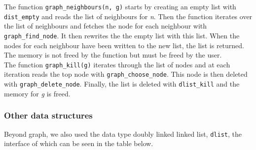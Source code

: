 \documentclass{article}
\begin{document}
\noindent
The function \texttt{graph\_neighbours(n, g)} starts by creating an empty list with \texttt{dist\_empty} and reads the list of neighbours for \textit{n}. Then the function iterates over the list of neighbours and fetches the node for each neighbour with \texttt{graph\_find\_node}. It then rewrites the the empty list with this list. When the nodes for each neighbour have been written to the new list, the list is returned. The memory is not freed by the function but must be freed by the user. \\

\noindent
The function \texttt{graph\_kill(g)} iterates through the list of nodes and at each iteration reads the top node with \texttt{graph\_choose\_node}. This node is then deleted with \texttt{graph\_delete\_node}. Finally, the list is deleted with \texttt{dlist\_kill} and the memory for \textit{g} is freed.


\subsubsection{Other data structures}
\label{sec:other_data_structures}
Beyond graph, we also used the data type doubly linked linked list, \texttt{dlist}, the interface of which can be seen in the table below. 
\end{document}
